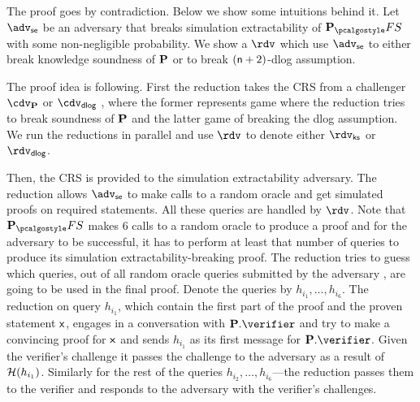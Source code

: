 \documentclass[runningheads,11pt]{llncs}
\theoremstyle{definition}
\begin{document}
The proof goes by contradiction. Below we show some intuitions behind it.
Let $\advse$ be an adversary that breaks simulation extractability of $\plonkprotfs$ with some non-negligible probability. 
We show a $\rdv$ which use $\advse$ to either break knowledge soundness of $\mathbf{P}$ or to break $(\mathsf{n} + 2)$-dlog assumption.

The proof idea is following. First the reduction takes the CRS from a challenger
$\cdv_\plonkprot$ or $\cdv_\dlog$ 
	, where the former represents game where the reduction tries to break soundness of $\mathbf{P}$ and the latter game of breaking the dlog assumption. We run the reductions in parallel and use $\rdv$ to denote either $\rdvks$ or $\rdvdlog$.

Then, the CRS is provided to the simulation extractability adversary. The reduction allows $\advse$ to make calls to a random oracle and get simulated proofs on required statements. All these queries are handled by $\rdv$.
Note that $\plonkprotfs$ makes $6$ calls to a random oracle to produce a proof
and for the adversary to be successful, it has to perform at least that number
of queries to produce its simulation extractability-breaking
proof.
	 The reduction tries to guess which queries,
out of all random oracle queries submitted by the adversary
, are going to be used in the final proof. Denote the queries by $h_{i_1}, \ldots, h_{i_6}$. 
The reduction on query $h_{i_1}$, which contain the first part of the proof and the proven statement $\mathsf{x}$, engages in a conversation with $\plonkprot.\verifier$ and try to make a convincing proof for $\mathsf{x}$ and sends $h_{i_1}$ as its first message for $\plonkprot.\verifier$. Given the verifier's challenge it passes the challenge to the adversary as a result of $\mathcal{H}(h_{i_1})$. 
Similarly for the rest of the queries $h_{i_2}, \ldots, h_{i_6}$---the reduction passes them to the verifier and responds to the adversary with the verifier's challenges.
\end{document}
